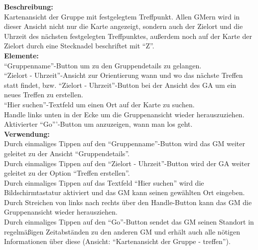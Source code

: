 \textbf{Beschreibung:}\\
Kartenansicht der Gruppe mit festgelegtem Treffpunkt. Allen GMern wird in dieser Ansicht nicht nur die Karte angezeigt, sondern auch der Zielort und die Uhrzeit des nächsten festgelegten Treffpunktes, außerdem noch auf der Karte der Zielort durch eine Stecknadel beschriftet mit "`Z"'.\\
\textbf{Elemente:}\\
"`Gruppenname"'-Button um zu den Gruppendetails zu gelangen.\\
"`Zielort - Uhrzeit"'-Ansicht zur Orientierung wann und wo das nächste Treffen statt findet, bzw. "`Zielort - Uhrzeit"'-Button bei der Ansicht des GA um ein neues Treffen zu erstellen.\\
"`Hier suchen"'-Textfeld um einen Ort auf der Karte zu suchen.\\
Handle links unten in der Ecke um die Gruppenansicht wieder herauszuziehen.\\
Aktivierter "`Go"''-Button um anzuzeigen, wann man los geht.\\
\textbf{Verwendung:}\\
Durch einmaliges Tippen auf den "`Gruppenname"'-Button wird das GM weiter geleitet zu der Ansicht "`Gruppendetails"'. \\
Durch einmaliges Tippen auf den "`Zielort - Uhrzeit"'-Button wird der GA weiter geleitet zu der Option "`Treffen erstellen"'.\\
Durch einmaliges Tippen auf das Textfeld "`Hier suchen"' wird die Bildschirmtastatur aktiviert und das GM kann seinen gewählten Ort eingeben.\\
Durch Streichen von links nach rechts über den Handle-Button kann das GM die Gruppenansicht wieder herausziehen.\\
Durch einmaliges Tippen auf den "`Go"'-Button sendet das GM seinen Standort in regelmäßigen Zeitabständen zu den anderen GM und erhält auch alle nötigen Informationen über diese (Ansicht: "`Kartenansicht der Gruppe - treffen"').
\clearpage
\newpage

